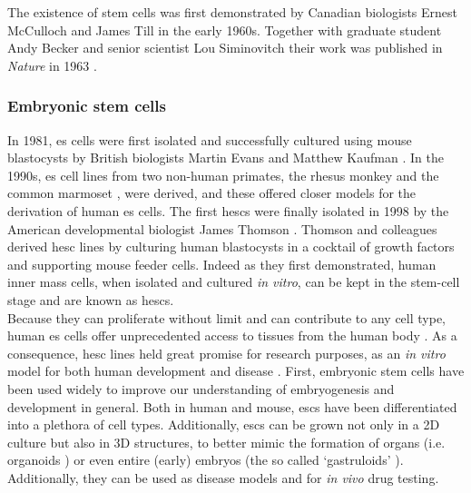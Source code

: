 The existence of stem cells was first demonstrated by Canadian biologists Ernest McCulloch and James Till in the early 1960s.
Together with graduate student Andy Becker and senior scientist Lou Siminovitch their work was published in \textit{Nature} in 1963 \cite{becker1963cytological}.

\subsubsection{Embryonic stem cells}
\label{sec:esc_induction}

In 1981, \gls{es} cells were first isolated and successfully cultured using mouse blastocysts by British biologists Martin Evans and Matthew Kaufman \cite{evans1981establishment, martin1981isolation}.
In the 1990s, \gls{es} cell lines from two non-human primates, the rhesus monkey \cite{thomson1995isolation} and the common marmoset \cite{thomson1996pluripotent}, were derived, and these offered closer models for the derivation of human \gls{es} cells. 
The first \glspl{hesc} were finally isolated in 1998 by the American developmental biologist James Thomson \cite{thomson1998embryonic}.
Thomson and colleagues derived \gls{hesc} lines by culturing human blastocysts in a cocktail of growth factors and supporting mouse feeder cells.
Indeed as they first demonstrated, human inner mass cells, when isolated and cultured \textit{in vitro}, can be kept in the stem-cell stage and are known as  \glspl{hesc}. \\

Because they can proliferate without limit and can contribute to any cell type, human \gls{es} cells offer unprecedented access to tissues from the human body \cite{department2006regenerative}. 
As a consequence, \gls{hesc} lines held great promise for research purposes, as an \textit{in vitro} model for both human development and disease \cite{saha2009technical}.
First, embryonic stem cells have been used widely to improve our understanding of embryogenesis and development in general. 
Both in human and mouse, \glspl{esc} have been differentiated into a plethora of cell types.
Additionally, \glspl{esc} can be grown not only in a 2D culture but also in 3D structures, to better mimic the formation of organs (i.e. organoids \cite{clevers2016modeling, lancaster2013cerebral}) or even entire (early) embryos (the so called `gastruloids' \cite{van2020single2}). 
Additionally, they can be used as disease models and for \textit{in vivo} drug testing.\\

